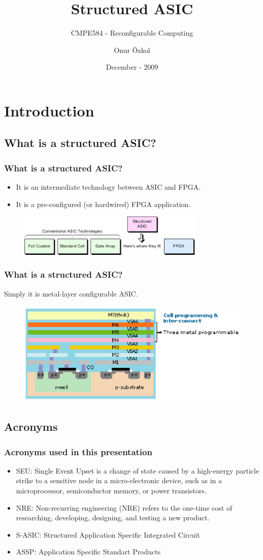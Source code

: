 \documentclass{beamer}
\title{Structured ASIC}
\subtitle{ }
\subtitle{CMPE584 - Reconfigurable Computing}
\author{Onur \"Ozkol}
\date{December - 2009}
\begin{document}
\frame{
  \titlepage
}

\section{Introduction}
\subsection{What is a structured ASIC?}
\frame
{
  \frametitle{What is a structured ASIC?}
  \begin{itemize}
  \item It is an intermediate technology between ASIC and FPGA.
  \item It is a pre-configured (or hardwired) FPGA application.
  \end{itemize}
  \begin{figure}[H]
  \includegraphics[height=20mm]{images/where_fit_asic.eps}
  \end{figure}
}

\frame
{
  \frametitle{What is a structured ASIC?}
  Simply it is metal-layer configurable ASIC.
  \begin{figure}[H]
  \includegraphics[height=50mm]{images/inside.eps}
  \end{figure}
}

\subsection{Acronyms}
\frame
{
  \frametitle{Acronyms used in this presentation}
  \begin{itemize}
  \item SEU: Single Event Upset is a change of state caused by a high-energy particle strike to a sensitive node in a micro-electronic device, such as in a microprocessor, semiconductor memory, or power transistors.
  \item NRE: Non-recurring engineering (NRE) refers to the one-time cost of researching, developing, designing, and testing a new product. 
  \item S-ASIC: Structured Application Specific Integrated Circuit
  \item ASSP: Application Specific Standart Products
  \end{itemize}
}
\end{document}
